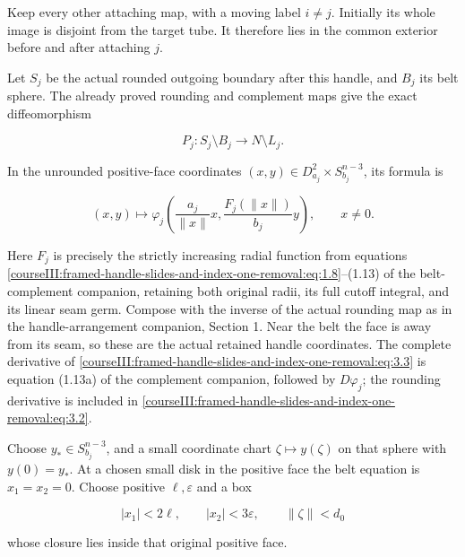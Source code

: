 Keep every other attaching map, with a moving label \(i\ne j\). Initially its whole image is disjoint from the target tube. It therefore lies in the common exterior before and after attaching \(j\).

Let \(S_j\) be the actual rounded outgoing boundary after this handle, and \(B_j\) its belt sphere. The already proved rounding and complement maps give the exact diffeomorphism

\begin{equation}
P_j:S_j\setminus B_j\longrightarrow N\setminus L_j.
 \label{courseIII:framed-handle-slides-and-index-one-removal:eq:3.2}
\end{equation}

In the unrounded positive-face coordinates \((x,y)\in D^2_{a_j}\times S^{n-3}_{b_j}\), its formula is

\begin{equation}
(x,y)\longmapsto
 \varphi_j\left(\frac{a_j}{\|x\|}x,\frac{F_j(\|x\|)}{b_j}y\right),
 \qquad x\ne0.
 \label{courseIII:framed-handle-slides-and-index-one-removal:eq:3.3}
\end{equation}

Here \(F_j\) is precisely the strictly increasing radial function from equations \eqref{courseIII:framed-handle-slides-and-index-one-removal:eq:1.8}--(1.13) of the belt-complement companion, retaining both original radii, its full cutoff integral, and its linear seam germ. Compose with the inverse of the actual rounding map as in the handle-arrangement companion, Section 1. Near the belt the face is away from its seam, so these are the actual retained handle coordinates. The complete derivative of \eqref{courseIII:framed-handle-slides-and-index-one-removal:eq:3.3} is equation (1.13a) of the complement companion, followed by \(D\varphi_j\); the rounding derivative is included in \eqref{courseIII:framed-handle-slides-and-index-one-removal:eq:3.2}.

Choose \(y_*\in S^{n-3}_{b_j}\), and a small coordinate chart \(\zeta\mapsto y(\zeta)\) on that sphere with \(y(0)=y_*\). At a chosen small disk in the positive face the belt equation is \(x_1=x_2=0\). Choose positive \(\ell,\varepsilon\) and a box

\begin{equation}
|x_1|<2\ell,\qquad |x_2|<3\varepsilon,\qquad
 \|\zeta\|<d_0
 \label{courseIII:framed-handle-slides-and-index-one-removal:eq:3.4}
\end{equation}

whose closure lies inside that original positive face.

